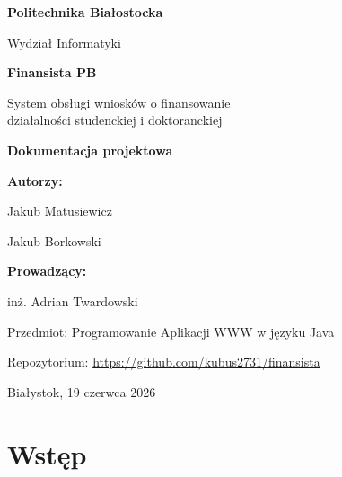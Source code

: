 \documentclass[12pt,a4paper]{article}
\begin{document}
	
	\begin{titlepage}
		\centering
		\vspace*{2cm}
		
		{\Large \textbf{Politechnika Białostocka} \par}
		{\large Wydział Informatyki \par}
		
		\vspace{3.5cm}
		
		{\Huge \textbf{Finansista PB} \par}
		\vspace{0.8cm}
		{\Large System obsługi wniosków o finansowanie \\ działalności studenckiej i doktoranckiej \par}
		
		\vspace{2.5cm}
		
		{\Large \textbf{Dokumentacja projektowa} \par}
		
		\vspace{2.5cm}
		
		{\large \textbf{Autorzy:} \par}
		\vspace{0.2cm}
		{\large Jakub Matusiewicz \par}
		{\large Jakub Borkowski \par}
		{\large \textbf{Prowadzący:} \par}
		\vspace{0.2cm}
		{\large inż. Adrian Twardowski \par}
		\vspace{0.8cm}
		{\small Przedmiot: Programowanie Aplikacji WWW w języku Java \par}
		\vspace{0.3cm}
		{\small Repozytorium: \url{https://github.com/kubus2731/finansista} \par}

		\vfill
		
		{\large Białystok, 19 czerwca 2026 \par}
	\end{titlepage}
	
	\thispagestyle{empty}
	\newpage
	
	\tableofcontents
	\newpage
\section{Wstęp}
\label{sec:wstep}
\end{document}
